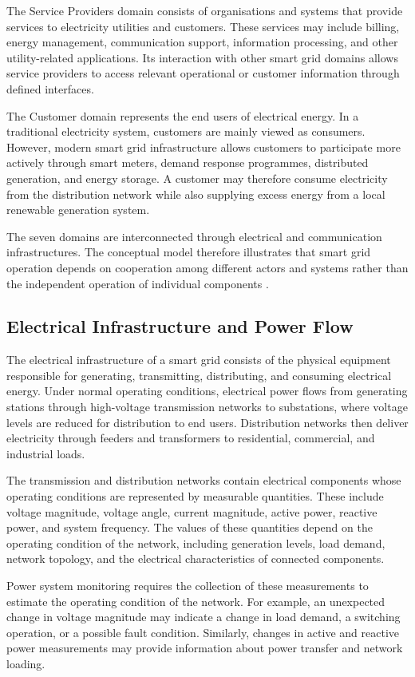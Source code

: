 \documentclass[12pt,a4paper]{report}
\begin{document}
The Service Providers domain consists of organisations and systems that provide services to
electricity utilities and customers. These services may include billing, energy management,
communication support, information processing, and other utility-related applications. Its
interaction with other smart grid domains allows service providers to access relevant operational
or customer information through defined interfaces.

The Customer domain represents the end users of electrical energy. In a traditional electricity
system, customers are mainly viewed as consumers. However, modern smart grid infrastructure
allows customers to participate more actively through smart meters, demand response programmes,
distributed generation, and energy storage. A customer may therefore consume electricity from
the distribution network while also supplying excess energy from a local renewable generation system.

The seven domains are interconnected through electrical and communication infrastructures. The
conceptual model therefore illustrates that smart grid operation depends on cooperation among
different actors and systems rather than the independent operation of individual components \cite{nist2014framework}.

\subsection{Electrical Infrastructure and Power Flow}
The electrical infrastructure of a smart grid consists of the physical equipment responsible
for generating, transmitting, distributing, and consuming electrical energy. Under normal
operating conditions, electrical power flows from generating stations through high-voltage
transmission networks to substations, where voltage levels are reduced for distribution to
end users. Distribution networks then deliver electricity through feeders and transformers to
residential, commercial, and industrial loads.

The transmission and distribution networks contain electrical components whose operating
conditions are represented by measurable quantities. These include voltage magnitude, voltage
angle, current magnitude, active power, reactive power, and system frequency. The values of these
quantities depend on the operating condition of the network, including generation levels, load
demand, network topology, and the electrical characteristics of connected components.

Power system monitoring requires the collection of these measurements to estimate the operating
condition of the network. For example, an unexpected change in voltage magnitude may indicate a
change in load demand, a switching operation, or a possible fault condition. Similarly, changes
in active and reactive power measurements may provide information about power transfer and
network loading.
\end{document}
